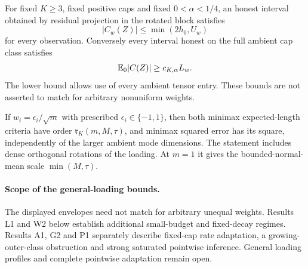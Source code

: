 \begin{theorem}\label{thm:weighted_bounds}
For fixed $K\ge3$, fixed positive caps and fixed $0<\alpha<1/4$, an honest interval obtained by residual projection in the rotated block satisfies
\[
 |C_w(Z)|\le\min(2h_0,U_w)
\]
for every observation. Conversely every interval honest on the full ambient cap class satisfies
\[
 \mathbb E_0|C(Z)|\ge c_{K,\alpha}L_w.
\]
The lower bound allows use of every ambient tensor entry. These bounds are not asserted to match for arbitrary nonuniform weights.
\end{theorem}

\begin{proposition}\label{prop:flat_loading}
If $w_i=\epsilon_i/\sqrt m$ with prescribed $\epsilon_i\in\{-1,1\}$, then both minimax expected-length criteria have order $\mathfrak r_K(m,M,\tau)$, and minimax squared error has its square, independently of the larger ambient mode dimensions. The statement includes dense orthogonal rotations of the loading. At $m=1$ it gives the bounded-normal-mean scale $\min(M,\tau)$.
\end{proposition}

\paragraph{Scope of the general-loading bounds.}
The displayed envelopes need not match for arbitrary unequal weights. Results L1 and W2 below establish additional small-budget and fixed-decay regimes. Results A1, G2 and P1 separately describe fixed-cap rate adaptation, a growing-outer-class obstruction and strong saturated pointwise inference. General loading profiles and complete pointwise adaptation remain open.
